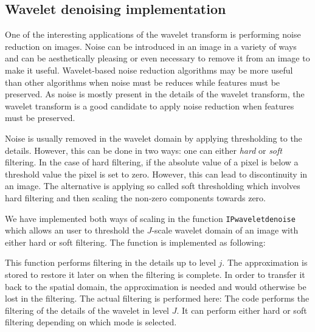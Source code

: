 \subsection{Wavelet denoising implementation}
One of the interesting applications of the wavelet transform is performing noise reduction on images. Noise can be introduced in an image in a variety of ways and can be aesthetically pleasing or even necessary to remove it from an image to make it useful. Wavelet-based noise reduction algorithms may be more useful than other algorithms when noise must be reduces while features must be preserved. As noise is mostly present in the details of the wavelet transform, the wavelet transform is a good candidate to apply noise reduction when features must be preserved.

Noise is usually removed in the wavelet domain by applying thresholding to the details. However, this can be done in two ways: one can either \textit{hard} or \textit{soft} filtering. In the case of hard filtering, if the absolute value of a pixel is below a threshold value the pixel is set to zero. However, this can lead to discontinuity in an image. The alternative is applying so called soft thresholding which involves hard filtering and then scaling the non-zero components towards zero. 

We have implemented both ways of scaling in the function \texttt{IPwaveletdenoise} which allows an user to threshold the $J$-scale wavelet domain of an image with either hard or soft filtering. The function is implemented as following:

This function performs filtering in the details up to level $j$. The approximation is stored to restore it later on when the filtering is complete. In order to transfer it back to the spatial domain, the approximation is needed and would otherwise be lost in the filtering. 
The actual filtering is performed here:
The code performs the filtering of the details of the wavelet in level $J$. It can perform either hard or soft filtering depending on which mode is selected. 

